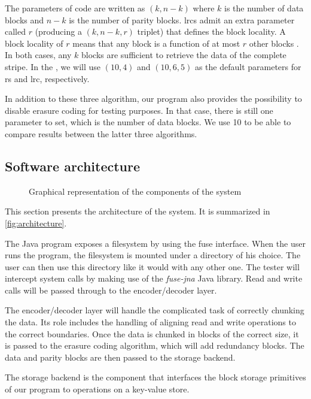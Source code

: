 The parameters of  code are written as $(k,n-k)$ where $k$ is the number of data blocks and $n-k$ is the number of parity blocks.
\acp{lrc} admit an extra parameter called $r$ (producing a $(k,n-k,r)$ triplet) that defines the block locality.
A block locality of $r$ means that any block is a function of at most $r$ other blocks \cite{XorbasVLDB}.
In both cases, any $k$ blocks are sufficient to retrieve the data of the complete stripe.
In the , we will use $(10,4)$ and $(10,6,5)$ as the default parameters for \ac{rs} and \ac{lrc}, respectively.

In addition to these three algorithm, our program also provides the possibility to disable erasure coding for testing purposes.
In that case, there is still one parameter to set, which is the number of data blocks.
We use 10 to be able to compare results between the latter three algorithms.

\subsection{Software architecture}
\label{subsec:architecture}

\begin{figure*}
	\centering
	
	\caption{Graphical representation of the components of the system}
	\label{fig:architecture}
\end{figure*}

This section presents the architecture of the system.
It is summarized in \autoref{fig:architecture}.

The Java program exposes a filesystem by using the \ac{fuse} interface.
When the user runs the program, the filesystem is mounted under a directory of his choice.
The user can then use this directory like it would with any other one.
The tester will intercept system calls by making use of the \textit{fuse-jna} \cite{fuse-jna} Java library.
Read and write calls will be passed through to the encoder/decoder layer.

The encoder/decoder layer will handle the complicated task of correctly chunking the data.
Its role includes the handling of aligning read and write operations to the correct boundaries.
Once the data is chunked in blocks of the correct size, it is passed to the erasure coding algorithm, which will add redundancy blocks.
The data and parity blocks are then passed to the storage backend.

The storage backend is the component that interfaces the block storage primitives of our program to operations on a key-value store.


